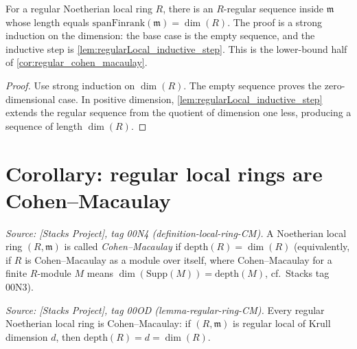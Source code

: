 \begin{lemma}\leanok
  \label{lem:exists_isRegular_of_regularLocal}
  For a regular Noetherian local ring \(R\), there is an \(R\)-regular sequence inside
  \(\mathfrak m\) whose length equals \(\text{spanFinrank}(\mathfrak m) = \dim(R)\). The proof is a
  strong induction on the dimension: the base case is the empty sequence, and the
  inductive step is \cref{lem:regularLocal_inductive_step}. This is the lower-bound half
  of \cref{cor:regular_cohen_macaulay}.
\end{lemma}
\begin{proof}

\leanok
  Use strong induction on \(\dim(R)\). The empty sequence proves the
  zero-dimensional case. In positive dimension,
  \cref{lem:regularLocal_inductive_step} extends the regular sequence from
  the quotient of dimension one less, producing a sequence of length
  \(\dim(R)\).
\end{proof}

\section{Corollary: regular local rings are Cohen--Macaulay}
\label{sec:ab_regular_cm}

\begin{definition}\leanok
  \label{def:cohen_macaulay_local}
  \textit{Source: [Stacks Project], tag 00N4 (definition-local-ring-CM).}
  A Noetherian local ring \((R, \mathfrak{m})\) is called \emph{Cohen--Macaulay} if
  \(\text{depth}(R) = \dim(R)\) (equivalently, if \(R\) is Cohen--Macaulay as a module
  over itself, where Cohen--Macaulay for a finite \(R\)-module \(M\) means
  \(\dim(\text{Supp}(M)) = \text{depth}(M)\), cf.\ Stacks tag 00N3).
\end{definition}

\begin{corollary}\leanok
  \label{cor:regular_cohen_macaulay}
  \textit{Source: [Stacks Project], tag 00OD (lemma-regular-ring-CM).}
  Every regular Noetherian local ring is Cohen--Macaulay: if \((R, \mathfrak{m})\) is
  regular local of Krull dimension \(d\), then \(\text{depth}(R) = d = \dim(R)\).
\end{corollary}

